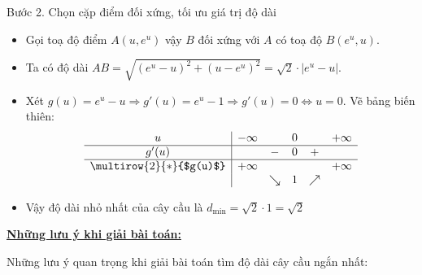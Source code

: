 \documentclass[12pt,a4paper,oneside]{book}
\theoremstyle{theorem}
\theoremstyle{definition}
\begin{document}
Bước 2. Chọn cặp điểm đối xứng, tối ưu giá trị độ dài
\begin{itemize}
    \item Gọi toạ độ điểm $A(u, e^u)$ vậy $B$ đối xứng với $A$ có toạ độ $B(e^u, u)$.
    \item Ta có độ dài $AB = \sqrt{(e^u - u)^2 + (u - e^u)^2} = \sqrt{2} \cdot |e^u - u|$.
    \item Xét $g(u) = e^u - u \Rightarrow g'(u) = e^u - 1 \Rightarrow g'(u) = 0 \Leftrightarrow u = 0$. Vẽ bảng biến thiên:
    $$\begin{array}{c|ccccc}
    u & -\infty & & 0 & & +\infty \\
    \hline
    g'(u) & & - & 0 & + & \\
    \hline
    \multirow{2}{*}{$g(u)$} & +\infty & & & & +\infty \\
    & & \searrow & 1 & \nearrow &
    \end{array}$$
    \item Vậy độ dài nhỏ nhất của cây cầu là $\boxed{d_{\min} = \sqrt{2} \cdot 1 = \sqrt{2}}$
\end{itemize}

        \textbf{\underline{Những lưu ý khi giải bài toán:}}

        Những lưu ý quan trọng khi giải bài toán tìm độ dài cây cầu ngắn nhất:
\end{document}
